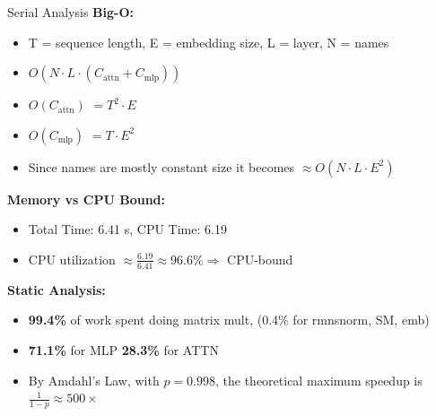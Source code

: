 \documentclass[aspectratio=169]{beamer}
\begin{document}
\begin{frame}{Serial Analysis}
    \textbf{Big-O: } \\
    \begin{itemize}
        \item T = sequence length, E = embedding size, L = layer, N = names
        \item $O(N \cdot L \cdot (C_{\text{attn}} + C_{\text{mlp}}))$ \\ 
        \item $O(C_{\text{attn}})$ $ = T^2 \cdot E$ \\
        \item $O(C_{\text{mlp}})$ $ = T \cdot E^{2}$\\ 
        \item Since names are mostly constant size it becomes $\approx O(N \cdot L \cdot E^2)$
    \end{itemize}

    \vspace{0.1cm}
    \large
    \textbf{Memory vs CPU Bound: }
    \begin{itemize}
        \item Total Time: 6.41 s, CPU Time: 6.19
        \item CPU utilization $\approx \frac{6.19}{6.41} \approx 96.6\% \Rightarrow$ CPU-bound
    \end{itemize}
    
    \vspace{0.1cm}
    \textbf{Static Analysis:}
    \begin{itemize}
        \item \textbf{99.4\%} of work spent doing matrix mult, (0.4\% for rmnsnorm, SM, emb)
        \item \textbf{71.1\%} for MLP \textbf{28.3\%} for ATTN  
        \item By Amdahl’s Law, with $p = 0.998$, the theoretical maximum speedup is $\frac{1}{1 - p} \approx 500\times$
    \end{itemize}
\end{frame}
\end{document}
